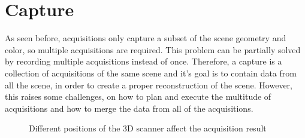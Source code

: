 \section{Capture}
\label{section:capture}

As seen before, acquisitions only capture a subset of the scene geometry and color, so multiple acquisitions are required. This problem can be partially solved by recording multiple acquisitions instead of once. Therefore, a capture is a collection of acquisitions of the same scene and it's goal is to contain data from all the scene, in order to create a proper reconstruction of the scene. However, this raises some challenges, on how to plan and execute the multitude of acquisitions and how to merge the data from all of the acquisitions.

\begin{figure}
    

    \caption{Different positions of the 3D scanner affect the acquisition result}

    \label{figure:scene-acquisitions-example}

\end{figure}